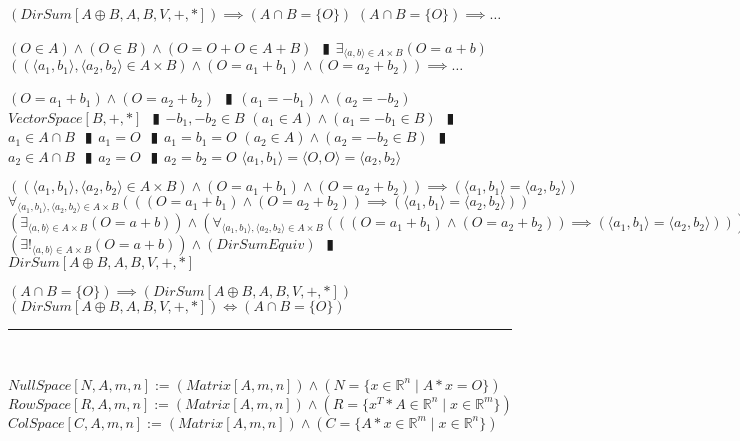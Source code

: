 \documentclass{book}
\newcommand{\abr}{:=}
\newcommand{\pipe}{$\phantom{(}\vrectangleblack\phantom{)}$}
\newcommand{\st}{\mathbin{|}}
\begin{document}
\begin{shaded}
\begin{enumerate}
    \lit $(DirSum[A \oplus B, A, B, V, +, *]) \implies (A \cap B = \{O\})$
    \lit $(A \cap B = \{O\}) \implies \ldots$
    \begin{enumerate}
      \lit $(O \in A) \land (O \in B) \land (O = O + O \in A + B)$ \pipe $\exists_{\langle a, b \rangle \in A \times B}(O = a + b)$
      \lit $((\langle a_1, b_1 \rangle, \langle a_2, b_2 \rangle \in A \times B) \land (O = a_1 + b_1) \land (O = a_2 + b_2)) \implies \ldots$
      \begin{enumerate}
        \lit $(O = a_1 + b_1) \land (O = a_2 + b_2)$ \pipe $(a_1 = -b_1) \land (a_2 = -b_2)$
        \lit $VectorSpace[B, +, *]$ \pipe $-b_1, -b_2 \in B$
        \lit $(a_1 \in A) \land (a_1 = -b_1 \in B)$ \pipe $a_1 \in A \cap B$ \pipe $a_1 = O$ \pipe $a_1 = b_1 = O$
        \lit $(a_2 \in A) \land (a_2 = -b_2 \in B)$ \pipe $a_2 \in A \cap B$ \pipe $a_2 = O$ \pipe $a_2 = b_2 = O$
        \lit $\langle a_1, b_1 \rangle = \langle O, O \rangle = \langle a_2, b_2 \rangle$
      \end{enumerate}
      \lit $((\langle a_1, b_1 \rangle, \langle a_2, b_2 \rangle \in A \times B) \land (O = a_1 + b_1) \land (O = a_2 + b_2)) \implies (\langle a_1, b_1 \rangle = \langle a_2, b_2 \rangle)$
      \lit $\forall_{\langle a_1, b_1 \rangle, \langle a_2, b_2 \rangle \in A \times B}(((O = a_1 + b_1) \land (O = a_2 + b_2)) \implies (\langle a_1, b_1 \rangle = \langle a_2, b_2 \rangle))$
      \lit $(\exists_{\langle a, b \rangle \in A \times B}(O = a + b)) \land (\forall_{\langle a_1, b_1 \rangle, \langle a_2, b_2 \rangle \in A \times B}(((O = a_1 + b_1) \land (O = a_2 + b_2)) \implies (\langle a_1, b_1 \rangle = \langle a_2, b_2 \rangle)))$
      \lit $(\exists!_{\langle a, b \rangle \in A \times B}(O = a + b)) \land (DirSumEquiv)$ \pipe $DirSum[A \oplus B, A, B, V, +, *]$
    \end{enumerate}
    \lit $(A \cap B = \{O\}) \implies (DirSum[A \oplus B, A, B, V, +, *])$
    \lit $(DirSum[A \oplus B, A, B, V, +, *]) \iff (A \cap B = \{O\})$
  \end{enumerate} \vspace{.75mm} \hrule \vspace{.75mm} \ \\
\end{shaded} %

$NullSpace[N, A, m, n] \abr (Matrix[A, m, n]) \land (N = \{x \in \mathbb{R}^n \st A * x = O\})$ \\  %
$RowSpace[R, A, m, n] \abr (Matrix[A, m, n]) \land (R = \{x^T * A \in \mathbb{R}^n \st x \in \mathbb{R}^m\})$ \\  %
$ColSpace[C, A, m, n] \abr (Matrix[A, m, n]) \land (C = \{A * x \in \mathbb{R}^m \st x \in \mathbb{R}^n\})$ \\  %
\end{document}
